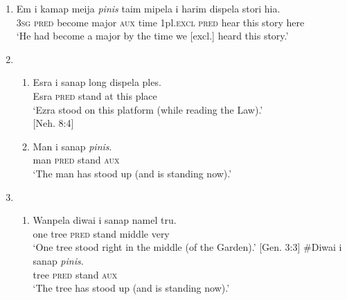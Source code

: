 {\begin{enumerate}
\item 
\gll  Em  i  kamap  meija  \textit{pinis}  taim  mipela  i  harim  dispela  stori  hia.\\
\textsc{3sg}  \textsc{pred}  become  major  \textsc{aux}  time  1pl.\textsc{excl}  \textsc{pred}  hear  this  story  here\\
\glt ‘He had become a major by the time we [excl.] heard this story.’  

\item
\begin{enumerate}[label=\alph*.]
\item
\gll  Esra  i  sanap  long  dispela  ples.\\
Esra  \textsc{pred}  stand  at  this  place\\
\glt ‘Ezra stood on this platform (while reading the Law).’ \\ \hfill  [Neh. 8:4]
\item
 \gll  Man  i  sanap  \textit{pinis}.\\
man  \textsc{pred}  stand  \textsc{aux}\\
\glt ‘The man has stood up (and is standing now).’  
\end{enumerate}

\item
\begin{enumerate}[label=\alph*.]
\item
\gll Wanpela  diwai  i  sanap  namel  tru.\\
one  tree  \textsc{pred}  stand  middle  very\\
\glt ‘One tree stood right in the middle (of the Garden).’  [Gen. 3:3]
\ex \gll  \#Diwai  i  sanap  \textit{pinis}.\\
    tree  \textsc{pred}  stand  \textsc{aux}\\
\glt ‘The tree has stood up (and is standing now).’  
\end{enumerate}
\end{enumerate}
}
 
